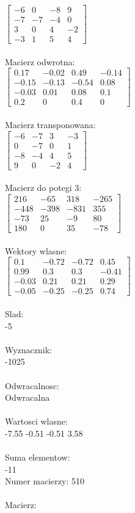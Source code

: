 \documentclass[a4paper,12pt]{article}
\begin{document}
$\begin{bmatrix} -6&0&-8&9\\-7&-7&-4&0\\3&0&4&-2\\-3&1&5&4 \end{bmatrix}$
\\
\\
Macierz odwrotna:\\

$\begin{bmatrix} 0.17&-0.02&0.49&-0.14\\-0.15&-0.13&-0.54&0.08\\-0.03&0.01&0.08&0.1\\0.2&0&0.4&0 \end{bmatrix}$
\\
\\
Macierz transponowana:\\

$\begin{bmatrix} -6&-7&3&-3\\0&-7&0&1\\-8&-4&4&5\\9&0&-2&4 \end{bmatrix}$
\\
\\
Macierz do potegi 3:\\

$\begin{bmatrix} 216&-65&318&-265\\-448&-398&-831&355\\-73&25&-9&80\\180&0&35&-78 \end{bmatrix}$
\\
\\
Wektory wlasne:\\

$\begin{bmatrix} 0.1&-0.72&-0.72&0.45\\0.99&0.3&0.3&-0.41\\-0.03&0.21&0.21&0.29\\-0.05&-0.25&-0.25&0.74 \end{bmatrix}$
\\
\\
Slad:\\
-5
\\
\\
Wyznacznik:\\
-1025
\\
\\
Odwracalnosc:\\
Odwracalna
\\
\\
Wartosci wlasne:\\
-7.55 -0.51 -0.51 3.58
\\
\\
Suma elementow:\\
-11
\\
\newpage
Numer macierzy:
510
\\
\\
Macierz:\\
\end{document}
